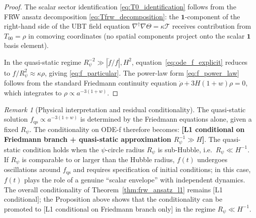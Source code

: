 \documentclass[12pt,a4paper]{article}
\theoremstyle{definition}
\theoremstyle{remark}
\newtheorem{remark}[theorem]{Remark}
\begin{document}
\begin{proof}
The scalar sector identification \eqref{eq:T0_identification} follows from the
FRW ansatz decomposition \eqref{eq:Tfrw_decomposition}: the $\mathbf{1}$-component
of the right-hand side of the UBT field equation $\nabla^\dagger\nabla\Theta=\kappa\mathcal{T}$
receives contribution from $T_{00} = \rho$ in comoving coordinates
(no spatial components project onto the scalar $\mathbf{1}$ basis element).

In the quasi-static regime $R_\psi^{-2} \gg |\ddot{f}/f|, H^2$,
equation~\eqref{eq:ode_f_explicit} reduces to
$f/R_\psi^2 \approx \kappa\rho$, giving \eqref{eq:f_particular}.
The power-law form \eqref{eq:f_power_law} follows from the standard
Friedmann continuity equation $\dot\rho + 3H(1+w)\rho = 0$,
which integrates to $\rho \propto a^{-3(1+w)}$.
\end{proof}

\begin{remark}[Physical interpretation and residual conditionality]
\label{rem:ode_f_physical}
The quasi-static solution $f_{\mathrm{qs}} \propto a^{-3(1+w)}$ is determined
by the Friedmann equations alone, given a fixed $R_\psi$.
The conditionality on ODE-f therefore becomes:
\textbf{[L1 conditional on Friedmann branch + quasi-static approximation
$R_\psi^{-1} \gg H$]}.
The quasi-static condition holds when the $\psi$-circle radius $R_\psi$ is
sub-Hubble, i.e.\ $R_\psi \ll H^{-1}$.
If $R_\psi$ is comparable to or larger than the Hubble radius, $f(t)$ undergoes
oscillations around $f_{\mathrm{qs}}$ and requires specification of initial
conditions; in this case, $f(t)$ plays the role of a genuine ``scalar envelope''
with independent dynamics.
The overall conditionality of Theorem~\ref{thm:frw_ansatz_l1} remains
[L1 conditional]; the Proposition above shows that the conditionality can be
promoted to [L1 conditional on Friedmann branch only] in the regime
$R_\psi \ll H^{-1}$.
\end{remark}
\end{document}

